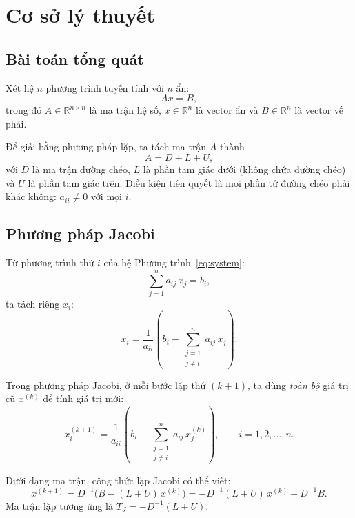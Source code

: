 \documentclass[12pt,a4paper]{article}
\begin{document}
\section{Cơ sở lý thuyết}

\subsection{Bài toán tổng quát}

Xét hệ $n$ phương trình tuyến tính với $n$ ẩn:
\begin{equation}
    Ax = B,
    \label{eq:system}
\end{equation}
trong đó $A\in\mathbb{R}^{n\times n}$ là ma trận hệ số, $x\in\mathbb{R}^n$ là vector ẩn và $B\in\mathbb{R}^n$ là vector vế phải.

Để giải bằng phương pháp lặp, ta tách ma trận $A$ thành
\[
    A = D + L + U,
\]
với $D$ là ma trận đường chéo, $L$ là phần tam giác dưới (không chứa đường chéo) và $U$ là phần tam giác trên. Điều kiện tiên quyết là mọi phần tử đường chéo phải khác không: $a_{ii}\neq 0$ với mọi $i$.

\subsection{Phương pháp Jacobi}

Từ phương trình thứ $i$ của hệ Phương trình~\eqref{eq:system}:
\[
    \sum_{j=1}^{n} a_{ij}\,x_j = b_i,
\]
ta tách riêng $x_i$:
\begin{equation}
    x_i = \frac{1}{a_{ii}}\left(b_i - \sum_{\substack{j=1\\j\neq i}}^{n} a_{ij}\,x_j\right).
    \label{eq:jacobi_formula}
\end{equation}

Trong phương pháp Jacobi, ở mỗi bước lặp thứ $(k+1)$, ta dùng \emph{toàn bộ} giá trị cũ $x^{(k)}$ để tính giá trị mới:
\begin{equation}
    x_i^{(k+1)} = \frac{1}{a_{ii}}\left(b_i - \sum_{\substack{j=1\\j\neq i}}^{n} a_{ij}\,x_j^{(k)}\right),
    \qquad i=1,2,\dots,n.
    \label{eq:jacobi}
\end{equation}

Dưới dạng ma trận, công thức lặp Jacobi có thể viết:
\[
    x^{(k+1)} = D^{-1}\bigl(B - (L+U)\,x^{(k)}\bigr) = -D^{-1}(L+U)\,x^{(k)} + D^{-1}B.
\]
Ma trận lặp tương ứng là $T_J = -D^{-1}(L+U)$.
\end{document}
